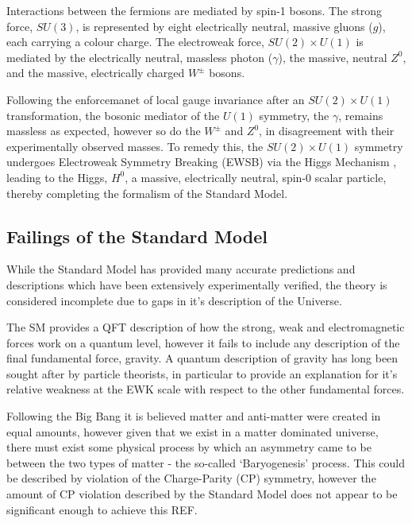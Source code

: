 Interactions between the fermions are mediated by spin-1 bosons. The strong 
force, $SU(3)$, is represented by eight electrically neutral, massive gluons 
($g$), each carrying a colour charge. The electroweak force, $SU(2)\times U(1)$
is
mediated by the electrically neutral, massless photon ($\gamma$), the massive,
neutral $Z^0$, and the massive, electrically charged $W^{\pm}$ bosons.

Following the enforcemanet of local gauge invariance after an
$SU(2)\times U (1)$ transformation,
the bosonic mediator of the $U(1)$ symmetry, the $\gamma$, remains massless as
expected, however so do the $W^{\pm}$ and $Z^0$, in disagreement with their
experimentally observed masses. To remedy this, the $SU(2)\times U(1)$ symmetry
undergoes Electroweak Symmetry Breaking (EWSB) via the Higgs Mechanism
\cite{PhysRevLett.13.321,PhysRevLett.13.508,PhysRevLett.13.585}, 
leading to the Higgs, $H^0$, a massive, electrically neutral, spin-0
scalar particle, thereby completing the formalism of the Standard Model.



\subsection{Failings of the Standard Model}

While the Standard Model has provided many accurate predictions and descriptions
which have been extensively experimentally verified, the theory is considered
incomplete due to gaps in it's description of the Universe.

The SM provides a QFT description of how the strong, weak and electromagnetic
forces work on a quantum level, however it fails to include any description of
the final fundamental force, gravity. A quantum description of gravity has long
been sought after by particle theorists, in particular to provide an explanation
for it's relative weakness at the EWK scale with respect to the other
fundamental forces.

Following the Big Bang it is believed matter and anti-matter were created in
equal amounts, however given that we exist in a matter dominated universe, there
must exist some physical process by which an asymmetry came to be between the
two types of matter - the so-called `Baryogenesis' process. This could
be described by violation of the Charge-Parity (CP) symmetry,
however the amount of CP violation described by the Standard Model
does not appear to be significant enough to achieve this REF.

